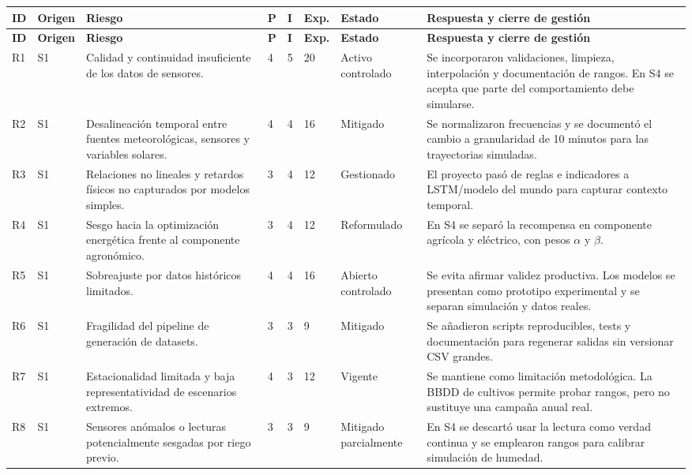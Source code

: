 \documentclass[11pt,a4paper]{article}
\begin{document}
\begin{landscape}
\small
\setlength{\tabcolsep}{3pt}
\begin{longtable}{p{1.6cm}p{1.4cm}p{5.2cm}p{0.8cm}p{0.8cm}p{1cm}p{2.6cm}p{6.8cm}}
\toprule
\textbf{ID} & \textbf{Origen} & \textbf{Riesgo} & \textbf{P} & \textbf{I} & \textbf{Exp.} & \textbf{Estado} & \textbf{Respuesta y cierre de gestión} \\
\midrule
\endfirsthead
\toprule
\textbf{ID} & \textbf{Origen} & \textbf{Riesgo} & \textbf{P} & \textbf{I} & \textbf{Exp.} & \textbf{Estado} & \textbf{Respuesta y cierre de gestión} \\
\midrule
\endhead
R1 & S1 & Calidad y continuidad insuficiente de los datos de sensores. & 4 & 5 & 20 & Activo controlado & Se incorporaron validaciones, limpieza, interpolación y documentación de rangos. En S4 se acepta que parte del comportamiento debe simularse. \\
R2 & S1 & Desalineación temporal entre fuentes meteorológicas, sensores y variables solares. & 4 & 4 & 16 & Mitigado & Se normalizaron frecuencias y se documentó el cambio a granularidad de 10 minutos para las trayectorias simuladas. \\
R3 & S1 & Relaciones no lineales y retardos físicos no capturados por modelos simples. & 3 & 4 & 12 & Gestionado & El proyecto pasó de reglas e indicadores a LSTM/modelo del mundo para capturar contexto temporal. \\
R4 & S1 & Sesgo hacia la optimización energética frente al componente agronómico. & 3 & 4 & 12 & Reformulado & En S4 se separó la recompensa en componente agrícola y eléctrico, con pesos $\alpha$ y $\beta$. \\
R5 & S1 & Sobreajuste por datos históricos limitados. & 4 & 4 & 16 & Abierto controlado & Se evita afirmar validez productiva. Los modelos se presentan como prototipo experimental y se separan simulación y datos reales. \\
R6 & S1 & Fragilidad del pipeline de generación de datasets. & 3 & 3 & 9 & Mitigado & Se añadieron scripts reproducibles, tests y documentación para regenerar salidas sin versionar CSV grandes. \\
R7 & S1 & Estacionalidad limitada y baja representatividad de escenarios extremos. & 4 & 3 & 12 & Vigente & Se mantiene como limitación metodológica. La BBDD de cultivos permite probar rangos, pero no sustituye una campaña anual real. \\
R8 & S1 & Sensores anómalos o lecturas potencialmente sesgadas por riego previo. & 3 & 3 & 9 & Mitigado parcialmente & En S4 se descartó usar la lectura como verdad continua y se emplearon rangos para calibrar simulación de humedad. \\

\end{longtable}
\end{landscape}
\end{document}
